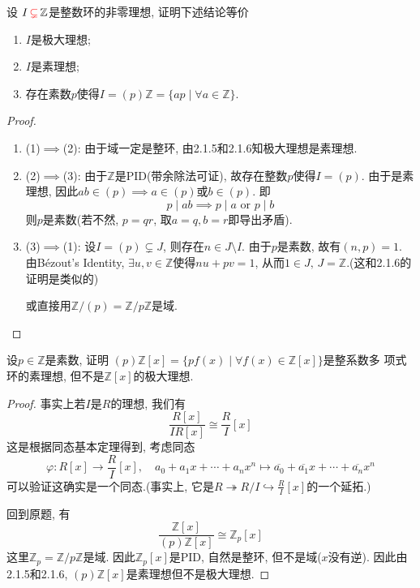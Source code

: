 \documentclass{../solutions-cn}
\begin{document}
\begin{exercise}[习题2.1.7]
    设 $I \,\textcolor{red}{\subsetneq}\, \mathbb{Z}$是整数环的非零理想, 证明下述结论等价
\begin{enumerate}[(1)]
    \item $I$是极大理想;
    \item $I$是素理想;
    \item 存在素数$p$使得$I = (p)\mathbb{Z} = \{ap \mid \forall a \in \mathbb{Z}\}$.
\end{enumerate}
\end{exercise}

\begin{proof}
    \begin{enumerate}[1.]
        \item (1)$\implies$(2): 由于域一定是整环, 由2.1.5和2.1.6知极大理想是素理想.
        \item (2)$\implies$(3): 由于$\mathbb{Z}$是PID(带余除法可证), 故存在整数$p$使得$I = (p)$. 由于是素理想, 因此$ab \in (p) \implies a \in (p)$或$b \in (p)$. 即
        \[
            p \mid ab \implies p \mid a \text{ or } p \mid b
        \]
        则$p$是素数(若不然, $p = qr$, 取$a = q, b = r$即导出矛盾).
        \item (3)$\implies$(1): 设$I = (p) \subsetneq J$, 则存在$n \in J \setminus I$. 由于$p$是素数, 故有$(n, p) = 1$. 由Bézout's Identity, $\exists u, v \in \mathbb{Z}$使得$nu + pv = 1$, 从而$1 \in J,\, J = \mathbb{Z}$.(这和2.1.6的证明是类似的)
        
        或直接用$\mathbb{Z}/(p) = \mathbb{Z}/p\mathbb{Z}$是域.
    \end{enumerate}
\end{proof}

\begin{exercise}[习题2.1.8]
    设$p \in \mathbb{Z}$是素数, 证明
$(p)\mathbb{Z}[x] = \{pf(x) \mid \forall f(x) \in \mathbb{Z}[x]\}$是整系数多
项式环的素理想, 但不是$\mathbb{Z}[x]$的极大理想.
\end{exercise}

\begin{proof}
    事实上若$I$是$R$的理想, 我们有
\[
    \frac{R[x]}{IR[x]} \cong \frac{R}{I}[x]
\]
这是根据同态基本定理得到, 考虑同态
\[
    \varphi: R[x] \to \frac{R}{I}[x],\quad a_0 + a_1x + \cdots + a_nx^n \mapsto \overline{a_0} + \overline{a_1}x + \cdots + \overline{a_n}x^n
\]
可以验证这确实是一个同态.(事实上, 它是$R \twoheadrightarrow R/I \hookrightarrow \frac{R}{I}[x]$的一个延拓.)

回到原题, 有
\[
    \frac{\mathbb{Z}[x]}{(p)\mathbb{Z}[x]} \cong \mathbb{Z}_p[x]
\]
这里$\mathbb{Z}_p = \mathbb{Z}/p\mathbb{Z}$是域. 因此$\mathbb{Z}_p[x]$是PID, 自然是整环, 但不是域($x$没有逆). 因此由2.1.5和2.1.6, $(p)\mathbb{Z}[x]$是素理想但不是极大理想.
\end{proof}
\end{document}
